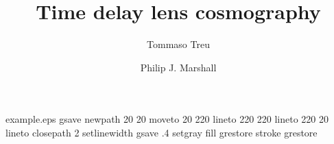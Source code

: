 %
\begin{filecontents*}{example.eps}
gsave
newpath
  20 20 moveto
  20 220 lineto
  220 220 lineto
  220 20 lineto
closepath
2 setlinewidth
gsave
  .4 setgray fill
grestore
stroke
grestore
\end{filecontents*}
%
\RequirePackage{fix-cm}
%
\documentclass[smallextended]{svjour3}       %
%
\smartqed  %
%
\usepackage{graphicx,natbib}
%
%
%
\newcommand{\mnras}{MNRAS}
%
%



\title{Time delay lens cosmography%
}


\author{Tommaso Treu         \and
        Philip J. Marshall %
}



